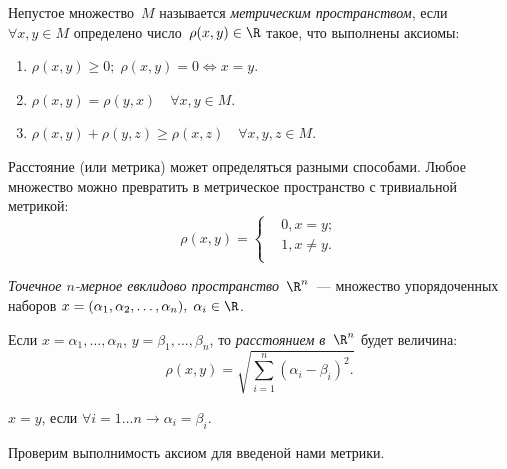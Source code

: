 \setcounter{section}{8}

\begin{definition}
Непустое множество~\(M\) называется \textit{метрическим пространством}, если \(\forall x, y \in M\)
определено число~\(\rho(x, y) \in \R\) такое, что выполнены аксиомы:
\begin{enumerate}
\item \(\rho(x, y) \geq 0; \; \rho(x, y) = 0 \Longleftrightarrow x = y\).
\item \(\rho(x, y) = \rho(y, x) \quad \forall x, y \in M\).
\item \(\rho(x, y) + \rho(y, z) \geq \rho(x, z) \quad \forall x, y, z \in M\).
\end{enumerate}
\end{definition}

\begin{note}
Расстояние (или метрика) может определяться разными способами. Любое множество можно превратить в
метрическое пространство с тривиальной метрикой:
\[
    \rho(x, y) = \left\{
        \begin{aligned}
            & 0, x = y;\\
            & 1, x \neq y.\\
        \end{aligned}
    \right .\]
\end{note}

\begin{definition}
\textit{Точечное \(n\)-мерное евклидово пространство~\(\R^n\)}~--- множество упорядоченных наборов
\(x = (\alpha_1, \alpha_2, \dots, \alpha_n), \; \alpha_i \in \R\).
\end{definition}

\begin{definition}
Если \(x = \alpha_1, \dots, \alpha_n\), \(y = \beta_1, \dots, \beta_n\), то \textit{расстоянием
в~\(\R^n\)} будет величина:
\[
    \rho(x, y) = \sqrt{\sum_{i=1}^n (\alpha_i - \beta_i)^2.}
\]
\end{definition}

\begin{definition}
\(x = y\), если \(\forall i = 1 \dots n \rightarrow \alpha_i = \beta_i\).
\end{definition}

Проверим выполнимость аксиом для введеной нами метрики.

